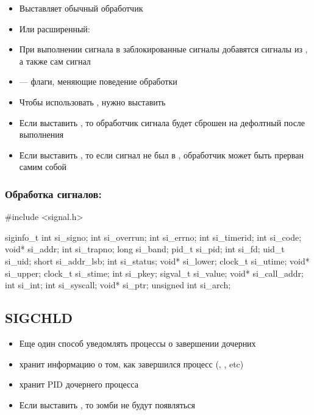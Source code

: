     \begin{itemize}
      \item Выставляет обычный обработчик 
      \item Или расширенный: 
      \item При выполнении сигнала  в заблокированные сигналы добавятся сигналы из , а также сам сигнал
      \item {} — флаги, меняющие поведение обработки
      \item Чтобы использовать , нужно выставить 
      \item Если выставить , то обработчик сигнала будет сброшен на дефолтный после выполнения
      \item Если выставить , то если сигнал не был в , обработчик может быть прерван самим собой
    \end{itemize}
  
  \subsubsection{Обработка сигналов: }
    \begin{cminted}
#include <signal.h>

siginfo_t {
  int      si_signo;     int      si_overrun;
  int      si_errno;     int      si_timerid;
  int      si_code;      void*    si_addr;
  int      si_trapno;    long     si_band;
  pid_t    si_pid;       int      si_fd;
  uid_t    si_uid;       short    si_addr_lsb;
  int      si_status;    void*    si_lower;
  clock_t  si_utime;     void*    si_upper;
  clock_t  si_stime;     int      si_pkey;
  sigval_t si_value;     void*    si_call_addr;
  int      si_int;       int      si_syscall;
  void*    si_ptr;       unsigned int si_arch;
}  
    \end{cminted}
  
  \subsection{SIGCHLD}
    \begin{itemize}
      \item Еще один способ уведомлять процессы о завершении дочерних
      \item {} хранит информацию о том, как завершился процесс (, , etc)
      \item {} хранит PID дочернего процесса
      \item Если выставить , то зомби не будут появляться
    \end{itemize}
  
